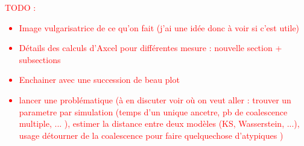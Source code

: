 \documentclass[12pt,a4paper]{report}
\begin{document}
\textcolor{red}{TODO : 
\begin{itemize}
  \item Image vulgarisatrice de ce qu'on fait (j'ai une idée donc à voir si c'est utile)
  \item  Détails des calculs d'Axcel pour différentes mesure : nouvelle section + subsections
\item Enchainer avec une succession de beau plot 
\item lancer une problématique
(à en discuter voir où on veut aller :
trouver un parametre par simulation
(temps d'un unique ancetre, pb de coalescence multiple, ... ),
estimer la distance entre deux modèles (KS, Wasserstein, ...),
usage détourner de la coalescence pour faire quelquechose
d'atypiques ) 
\end{itemize}
}
\end{document}
